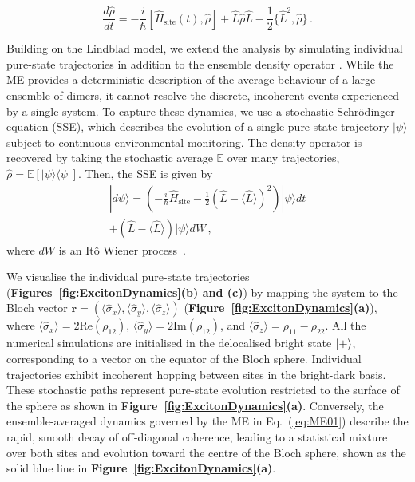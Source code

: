 \documentclass[journal=jpcbfk, manuscript=article, layout=twocolumn, doi=true]{achemso}
\begin{document}
\begin{equation}
    \frac{d\hat{\rho}}{dt}=-\frac{i}{\hbar}[\hat H_{\text{site}}(t),\hat\rho] + \hat{L} \hat\rho \hat{L} - \frac{1}{2} \{\hat{L}^2, \hat\rho\}\,.
    \label{eq:ME01}
\end{equation}

Building on the Lindblad model, we extend the analysis by simulating individual pure-state trajectories in addition to the ensemble density operator \cite{abrahams2025excitonic}. While the ME provides a deterministic description of the average behaviour of a large ensemble of dimers, it cannot resolve the discrete, incoherent events experienced by a single system. To capture these dynamics, we use a stochastic Schrödinger equation (SSE), which describes the evolution of a single pure-state trajectory $|\psi\rangle$ subject to continuous environmental monitoring. The density operator is recovered by taking the stochastic average $\mathbb{E}$ over many trajectories, $\hat{\rho} = \mathbb{E}[|\psi\rangle\langle\psi|]$. Then, the SSE is given by
\begin{multline}
    |d\psi\rangle = \left( -\frac{i}{\hbar}\hat{H}_{\text{site}} - \frac{1}{2}(\hat{L} - \langle \hat{L} \rangle)^2 \right) |\psi\rangle dt \\
    + (\hat{L} - \langle \hat{L} \rangle) |\psi\rangle dW \, ,
\end{multline}
where $dW$ is an It\^{o} Wiener process~\cite{petruccione}.

We visualise the individual pure-state trajectories (\textbf{Figures~\ref{fig:ExcitonDynamics}(b) and (c)}) by mapping the system to the Bloch vector $\mathbf{r} = (\langle\hat\sigma_x\rangle, \langle\hat\sigma_y\rangle, \langle\hat\sigma_z\rangle)$ (\textbf{Figure~\ref{fig:ExcitonDynamics}(a)}), where $\langle\hat\sigma_x\rangle = 2\text{Re}(\rho_{12})$, $\langle\hat\sigma_y\rangle = 2\text{Im}(\rho_{12})$, and $\langle\hat\sigma_z\rangle = \rho_{11} - \rho_{22}$. All the numerical simulations are initialised in the delocalised bright state $\ket{+}$, corresponding to a vector on the equator of the Bloch sphere. Individual trajectories exhibit incoherent hopping between sites in the bright-dark basis. These stochastic paths represent pure-state evolution restricted to the surface of the sphere as shown in \textbf{Figure~\ref{fig:ExcitonDynamics}(a)}. Conversely, the ensemble-averaged dynamics governed by the ME in Eq.~(\ref{eq:ME01}) describe the rapid, smooth decay of off-diagonal coherence, leading to a statistical mixture over both sites and evolution toward the centre of the Bloch sphere, shown as the solid blue line in \textbf{Figure~\ref{fig:ExcitonDynamics}(a)}.
\end{document}
